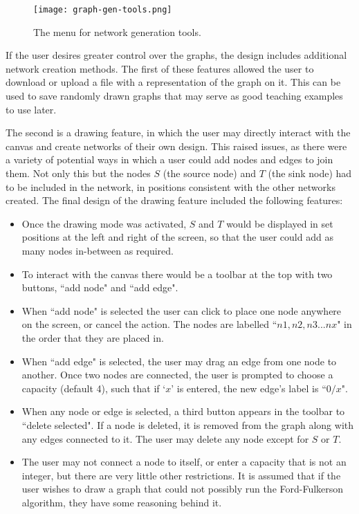 \documentclass{l4proj}
\begin{document}
\begin{figure}[h]
    \centering
    \texttt{[image: graph-gen-tools.png]}
    \caption{The menu for network generation tools.}
    \label{fig:my_label}
\end{figure}

If the user desires greater control over the graphs, the design includes additional network creation methods. The first of these features allowed the user to download or upload a file with a representation of the graph on it. This can be used to save randomly drawn graphs that may serve as good teaching examples to use later.

The second is a drawing feature, in which the user may directly interact with the canvas and create networks of their own design. This raised issues, as there were a variety of potential ways in which a user could add nodes and edges to join them. Not only this but the nodes $S$ (the source node) and $T$ (the sink node) had to be included in the network, in positions consistent with the other networks created. The final design of the drawing feature included the following features:
\begin{itemize}[noitemsep]
    \item Once the drawing mode was activated, $S$ and $T$ would be displayed in set positions at the left and right of the screen, so that the user could add as many nodes in-between as required.
    \item To interact with the canvas there would be a toolbar at the top with two buttons, ``add node" and ``add edge".
    \item When ``add node" is selected the user can click to place one node anywhere on the screen, or cancel the action. The nodes are labelled ``$n1, n2, n3... nx$" in the order that they are placed in.
    \item When ``add edge" is selected, the user may drag an edge from one node to another. Once two nodes are connected, the user is prompted to choose a capacity (default 4), such that if `$x$' is entered, the new edge's label is ``$0/x$".
    \item When any node or edge is selected, a third button appears in the toolbar to ``delete selected". If a node is deleted, it is removed from the graph along with any edges connected to it. The user may delete any node except for $S$ or $T$.
    \item The user may not connect a node to itself, or enter a capacity that is not an integer, but there are very little other restrictions. It is assumed that if the user wishes to draw a graph that could not possibly run the Ford-Fulkerson algorithm, they have some reasoning behind it.
\end{itemize}
\end{document}
